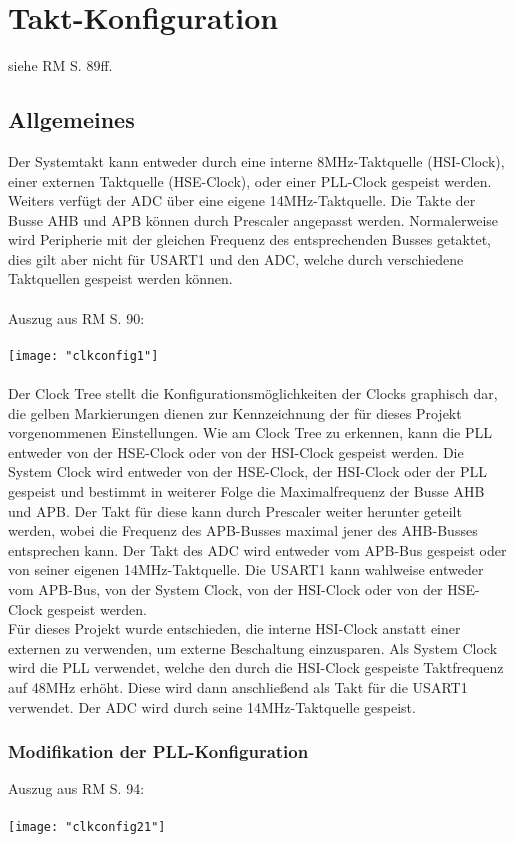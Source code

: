 \documentclass[11pt]{report}
\begin{document}
	\section{Takt-Konfiguration}
		\label{sec:clkconfig}
		siehe RM S. 89ff.\\
		\subsection{Allgemeines}
			 Der Systemtakt kann entweder durch eine interne 8MHz-Taktquelle (HSI-Clock), einer externen Taktquelle (HSE-Clock), oder einer PLL-Clock gespeist werden. Weiters verfügt der ADC über eine eigene 14MHz-Taktquelle. Die Takte der Busse AHB und APB können durch Prescaler angepasst werden. Normalerweise wird Peripherie mit der gleichen Frequenz des entsprechenden Busses getaktet, dies gilt aber nicht für USART1 und den ADC, welche durch verschiedene Taktquellen gespeist werden können.\\
			\\Auszug aus RM S. 90:\\
			\\\texttt{[image: "clkconfig1"]}\\
			\\Der Clock Tree stellt die Konfigurationsmöglichkeiten der Clocks graphisch dar, die gelben Markierungen dienen zur Kennzeichnung der für dieses Projekt vorgenommenen Einstellungen. Wie am Clock Tree zu erkennen, kann die PLL entweder von der HSE-Clock oder von der HSI-Clock gespeist werden. Die System Clock wird entweder von der HSE-Clock, der HSI-Clock oder der PLL gespeist und bestimmt in weiterer Folge die Maximalfrequenz der Busse AHB und APB. Der Takt für diese kann durch Prescaler weiter herunter geteilt werden, wobei die Frequenz des APB-Busses maximal jener des AHB-Busses entsprechen kann. Der Takt des ADC wird entweder vom APB-Bus gespeist oder von seiner eigenen 14MHz-Taktquelle. Die USART1 kann wahlweise entweder vom APB-Bus, von der System Clock, von der HSI-Clock oder von der HSE-Clock gespeist werden.\\
			Für dieses Projekt wurde entschieden, die interne HSI-Clock anstatt einer externen zu verwenden, um externe Beschaltung einzusparen. Als System Clock wird die PLL verwendet, welche den durch die HSI-Clock gespeiste Taktfrequenz auf 48MHz erhöht. Diese wird dann anschließend als Takt für die USART1 verwendet. Der ADC wird durch seine 14MHz-Taktquelle gespeist.
			\subsubsection{Modifikation der PLL-Konfiguration}
			Auszug aus RM S. 94:\\
			\\\texttt{[image: "clkconfig21"]}\\
\end{document}
